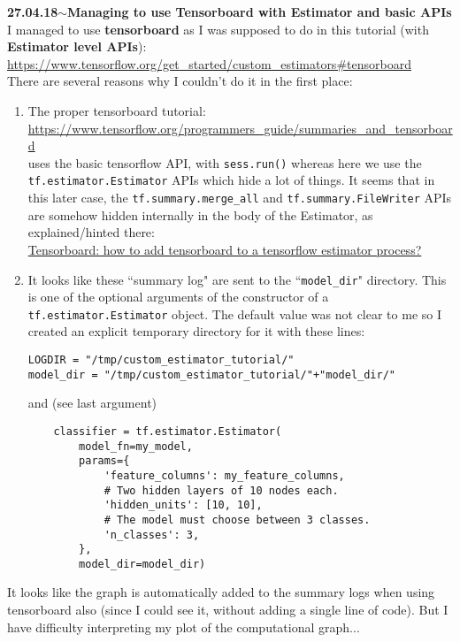 \documentclass[11pt,a4paper]{article}
\newenvironment{loggentry}[2]%
{\noindent\textbf{#1}\hspace{1cm}$\mathbf{\sim}$\text{ }\textbf{#2}\\}{\vspace{0.5cm}}
\begin{document}
\begin{loggentry}{27.04.18}{Managing to use Tensorboard with Estimator and basic APIs}
I managed to use \textbf{tensorboard} as I was supposed to do in this tutorial (with \textbf{Estimator level APIs}):\\
\url{https://www.tensorflow.org/get_started/custom_estimators#tensorboard}\\
There are several reasons why I couldn't do it in the first place:
\begin{enumerate}
\item The proper tensorboard tutorial:
\url{https://www.tensorflow.org/programmers_guide/summaries_and_tensorboard}\\
uses the basic tensorflow API, with \texttt{sess.run()} whereas here we use the \texttt{tf.estimator.Estimator} APIs which hide a lot of things. It seems that in this later case, the \texttt{tf.summary.merge\_all} and \texttt{tf.summary.FileWriter} APIs are somehow hidden internally in the body of the Estimator, as explained/hinted there:\\
\href{https://stackoverflow.com/questions/43908432/how-to-add-tensorboard-to-a-tensorflow-estimator-process}{Tensorboard: how to add tensorboard to a tensorflow estimator process?}
\item It looks like these ``summary log" are sent to the ``\texttt{model\_dir}" directory. This is one of the optional arguments of the constructor of a \texttt{tf.estimator.Estimator} object. The default value was not clear to me so I created an explicit temporary directory for it with these lines:
\begin{verbatim}
LOGDIR = "/tmp/custom_estimator_tutorial/"
model_dir = "/tmp/custom_estimator_tutorial/"+"model_dir/"
\end{verbatim}
and (see last argument)
\begin{verbatim}
    classifier = tf.estimator.Estimator(
        model_fn=my_model,
        params={
            'feature_columns': my_feature_columns,
            # Two hidden layers of 10 nodes each.
            'hidden_units': [10, 10],
            # The model must choose between 3 classes.
            'n_classes': 3,
        },
        model_dir=model_dir)
\end{verbatim}
\end{enumerate}
It looks like the graph is automatically added to the summary logs when using tensorboard also (since I could see it, without adding a single line of code). But I have difficulty interpreting my plot of the computational graph...\\

\end{loggentry}
\end{document}
